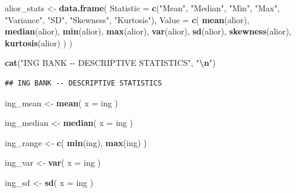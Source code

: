 \documentclass[
]{article}
\newenvironment{Shaded}{\begin{snugshade}}{\end{snugshade}}
\newcommand{\AttributeTok}[1]{\textcolor[rgb]{0.13,0.29,0.53}{#1}}
\newcommand{\FunctionTok}[1]{\textcolor[rgb]{0.13,0.29,0.53}{\textbf{#1}}}
\newcommand{\NormalTok}[1]{#1}
\newcommand{\OtherTok}[1]{\textcolor[rgb]{0.56,0.35,0.01}{#1}}
\newcommand{\SpecialCharTok}[1]{\textcolor[rgb]{0.81,0.36,0.00}{\textbf{#1}}}
\newcommand{\StringTok}[1]{\textcolor[rgb]{0.31,0.60,0.02}{#1}}
\begin{document}
\begin{Shaded}
\begin{Highlighting}[]
\NormalTok{alior\_stats }\OtherTok{\textless{}{-}} \FunctionTok{data.frame}\NormalTok{(}
  \AttributeTok{Statistic =} \FunctionTok{c}\NormalTok{(}\StringTok{"Mean"}\NormalTok{, }\StringTok{"Median"}\NormalTok{, }\StringTok{"Min"}\NormalTok{, }\StringTok{"Max"}\NormalTok{, }\StringTok{"Variance"}\NormalTok{, }\StringTok{"SD"}\NormalTok{, }\StringTok{"Skewness"}\NormalTok{, }\StringTok{"Kurtosis"}\NormalTok{),}
  \AttributeTok{Value =} \FunctionTok{c}\NormalTok{(}
    \FunctionTok{mean}\NormalTok{(alior),}
    \FunctionTok{median}\NormalTok{(alior),}
    \FunctionTok{min}\NormalTok{(alior),}
    \FunctionTok{max}\NormalTok{(alior),}
    \FunctionTok{var}\NormalTok{(alior),}
    \FunctionTok{sd}\NormalTok{(alior),}
    \FunctionTok{skewness}\NormalTok{(alior),}
    \FunctionTok{kurtosis}\NormalTok{(alior)}
\NormalTok{  )}
\NormalTok{)}
\end{Highlighting}
\end{Shaded}

\begin{Shaded}
\begin{Highlighting}[]
\FunctionTok{cat}\NormalTok{(}\StringTok{"ING BANK {-}{-} DESCRIPTIVE STATISTICS"}\NormalTok{, }\StringTok{"}\SpecialCharTok{\textbackslash{}n}\StringTok{"}\NormalTok{)}
\end{Highlighting}
\end{Shaded}

\begin{verbatim}
## ING BANK -- DESCRIPTIVE STATISTICS
\end{verbatim}

\begin{Shaded}
\begin{Highlighting}[]
\NormalTok{ing\_mean }\OtherTok{\textless{}{-}} \FunctionTok{mean}\NormalTok{(}
  \AttributeTok{x =}\NormalTok{ ing}
\NormalTok{)}

\NormalTok{ing\_median }\OtherTok{\textless{}{-}} \FunctionTok{median}\NormalTok{(}
  \AttributeTok{x =}\NormalTok{ ing}
\NormalTok{)}
\end{Highlighting}
\end{Shaded}

\begin{Shaded}
\begin{Highlighting}[]
\NormalTok{ing\_range }\OtherTok{\textless{}{-}} \FunctionTok{c}\NormalTok{(}
  \FunctionTok{min}\NormalTok{(ing),}
  \FunctionTok{max}\NormalTok{(ing)}
\NormalTok{)}

\NormalTok{ing\_var }\OtherTok{\textless{}{-}} \FunctionTok{var}\NormalTok{(}
  \AttributeTok{x =}\NormalTok{ ing}
\NormalTok{)}

\NormalTok{ing\_sd }\OtherTok{\textless{}{-}} \FunctionTok{sd}\NormalTok{(}
  \AttributeTok{x =}\NormalTok{ ing}
\NormalTok{)}
\end{Highlighting}
\end{Shaded}
\end{document}

